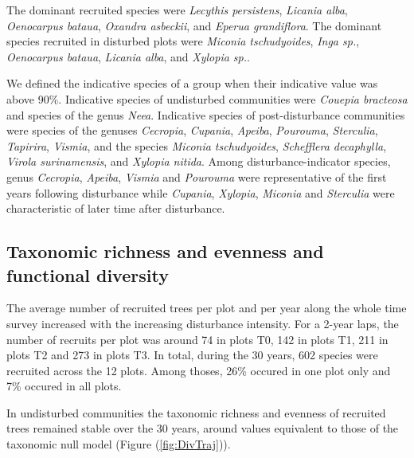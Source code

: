 \documentclass[fleqn,10pt]{ArtEcoFoG} %
\begin{document}
The dominant recruited species were \emph{Lecythis persistens}, \emph{Licania alba}, \emph{Oenocarpus bataua}, \emph{Oxandra asbeckii}, and \emph{Eperua grandiflora}.
The dominant species recruited in disturbed plots were \emph{Miconia tschudyoides}, \emph{Inga sp.}, \emph{Oenocarpus bataua}, \emph{Licania alba}, and \emph{Xylopia sp.}.

We defined the indicative species of a group when their indicative value was above 90\%.
Indicative species of undisturbed communities were \emph{Couepia bracteosa} and species of the genus \emph{Neea}.
Indicative species of post-disturbance communities were species of the genuses \emph{Cecropia}, \emph{Cupania}, \emph{Apeiba}, \emph{Pourouma}, \emph{Sterculia}, \emph{Tapirira}, \emph{Vismia}, and the species \emph{Miconia tschudyoides}, \emph{Schefflera decaphylla}, \emph{Virola surinamensis}, and \emph{Xylopia nitida}.
Among disturbance-indicator species, genus \emph{Cecropia}, \emph{Apeiba}, \emph{Vismia} and \emph{Pourouma} were representative of the first years following disturbance while \emph{Cupania}, \emph{Xylopia}, \emph{Miconia} and \emph{Sterculia} were characteristic of later time after disturbance.
\color{black}

\hypertarget{taxonomic-richness-and-evenness-and-functional-diversity}{%
\subsection{Taxonomic richness and evenness and functional diversity}\label{taxonomic-richness-and-evenness-and-functional-diversity}}

\color{red}

The average number of recruited trees per plot and per year along the whole time survey increased with the increasing disturbance intensity.
For a 2-year laps, the number of recruits per plot was around 74 in plots T0, 142 in plots T1, 211 in plots T2 and 273 in plots T3.
In total, during the 30 years, 602 species were recruited across the 12 plots.
Among thoses, 26\% occured in one plot only and 7\% occured in all plots.
\color{black}

In undisturbed communities the taxonomic richness and evenness of recruited trees remained stable over the 30 years, around values equivalent to those of the taxonomic null model (Figure (\ref{fig:DivTraj})).
\end{document}
